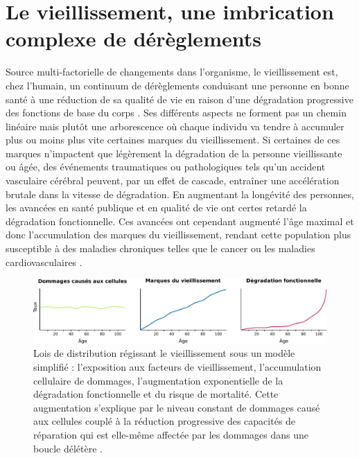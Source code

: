 \section{Le vieillissement, une imbrication complexe de dérèglements}


Source multi-factorielle de changements dans l'organisme, le vieillissement est, chez l'humain, un continuum de dérèglements conduisant une personne en bonne santé à une réduction de sa qualité de vie en raison d'une dégradation progressive des fonctions de base du corps \cite{Berrut2013}. Ses différents aspects ne forment pas un chemin linéaire mais plutôt une arborescence où chaque individu va tendre à accumuler plus ou moins plus vite certaines marques du vieillissement. Si certaines de ces marques n'impactent que légèrement la dégradation de la personne vieillissante ou âgée, des événements traumatiques ou pathologiques tels qu'un accident vasculaire cérébral peuvent, par un effet de cascade, entraîner une accélération brutale dans la vitesse de dégradation. En augmentant la longévité des personnes, les avancées en santé publique et en qualité de vie ont certes retardé la dégradation fonctionnelle. Ces avancées ont cependant augmenté l'âge maximal et donc l'accumulation des marques du vieillissement, rendant cette population plus susceptible à des maladies chroniques telles que le cancer ou les maladies cardiovasculaires \cite{Khan2017Aug}. 

\begin{figure}
    \centering
    \includegraphics[width=\textwidth]{img/intro/4_aging/intro_4_aging_rate_marks.pdf}
    \caption[Lois de distribution régissant le vieillissement sous un modèle simplifié]{Lois de distribution régissant le vieillissement sous un modèle simplifié : l'exposition aux facteurs de vieillissement, l'accumulation cellulaire de dommages, l'augmentation exponentielle de la dégradation fonctionnelle et du risque de mortalité. Cette augmentation s'explique par le niveau constant de dommages causé aux cellules couplé à la réduction progressive des capacités de réparation qui est elle-même affectée par les dommages dans une boucle délétère \cite{Todhunter2018}.}
    \label{fig:aging_rate_marks}
\end{figure}

